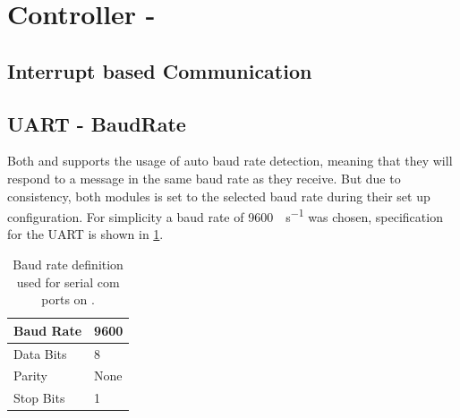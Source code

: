 \section{Controller - \SAMD}

\subsection{Interrupt based Communication}


\subsection{UART - BaudRate}
Both \SARA and \GPS supports the usage of auto baud rate detection, meaning that they will respond to a message in the same baud rate as they receive.
But due to consistency, both modules is set to the selected baud rate during their set up configuration. 
For simplicity a baud rate of \SI[per-mode = symbol]{9600}{\bit\per\second} was chosen, specification for the UART is shown in \cref{tab:BaudRate}.

\begin{table}[H]
	\begin{tabular}{ll}
		\hline 
		Baud Rate & 9600 \\ 
		\hline 
		Data Bits & 8 \\ 
		\hline 
		Parity & None \\ 
		\hline 
		Stop Bits & 1 \\ 
		\hline 
	\end{tabular}
	\centering
	\caption{Baud rate definition used for serial com ports on \SAMD.}
	\label{tab:BaudRate}
\end{table} 

\FloatBarrier